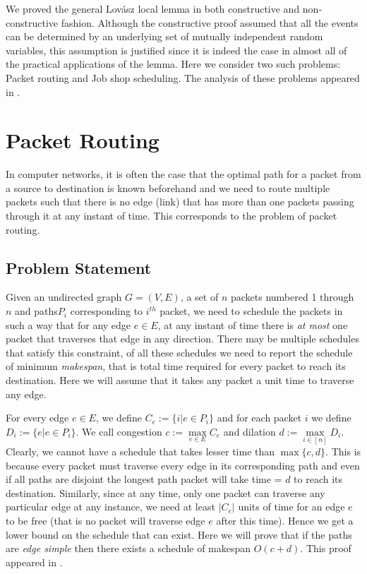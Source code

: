 We proved the general Lov\'asz local lemma in both constructive and non-constructive fashion. Although the constructive proof assumed that all the events can be determined by an underlying set of mutually independent random variables, 
this assumption is justified since it is indeed the case in almost all of the practical applications of the lemma. Here we consider two such problems: Packet routing and Job shop scheduling. The analysis of these problems appeared in \cite{srinivasan}.

\section{Packet Routing}
In computer networks, it is often the case that the optimal path for a packet from a source to destination is known beforehand and we need to route multiple packets such that there is no edge (link) that has more than one packets passing through it at any instant of time. This corresponds to the problem of packet routing.

\subsection{Problem Statement}
Given an undirected graph $G=(V,E) $, a set of $n$ packets numbered 1 through $n$ and paths$P_i$ corresponding to $i^{th}$ packet, we need to schedule the packets in such a way that for any edge $e\in E $, at any instant of time there is \emph{at most} one packet that traverses that edge in any direction. There may be multiple schedules that satisfy this constraint, of all these schedules we need to report the schedule of minimum \emph{makespan}, that is total time required for every packet to reach its destination. Here we will assume that it takes any packet a unit time to traverse any edge.

For every edge $e\in E$, we define 
$C_e := \{i| e\in P_i \} $ and for each packet $i$ we define $D_i:=\{e|e\in P_i \} $. We call congestion $c:=\max\limits_{e\in E}C_e $ and dilation $d:=\max\limits_{i\in[n]}D_i $. Clearly, we cannot have a schedule that takes lesser time than $\max\{c,d\} $. This is because every packet must traverse every edge in its corresponding path and even if all paths are disjoint the longest path packet will take time = $d$ to reach its destination. Similarly, since at any time, only one packet can traverse any particular edge at any instance, we need at least $|C_e| $ units of time for an edge $e$ to be free (that is no packet will traverse edge $e$ after this time). Hence we get a lower bound on the schedule that can exist. Here we will prove that if the paths are \emph{edge simple} then there exists a schedule of makespan $O(c+d)$. This proof appeared in \cite{jobshop}. 

